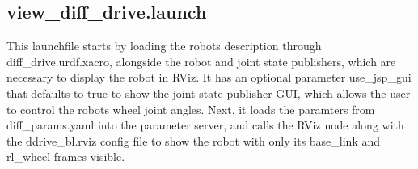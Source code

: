 \subsection*{view\+\_\+diff\+\_\+drive.\+launch}

This launchfile starts by loading the robot\textquotesingle{}s description through {\ttfamily diff\+\_\+drive.\+urdf.\+xacro}, alongside the robot and joint state publishers, which are necessary to display the robot in {\ttfamily R\+Viz}. It has an optional parameter {\ttfamily use\+\_\+jsp\+\_\+gui} that defaults to true to show the joint state publisher G\+UI, which allows the user to control the robot\textquotesingle{}s wheel joint angles. Next, it loads the paramters from {\ttfamily diff\+\_\+params.\+yaml} into the parameter server, and calls the {\ttfamily R\+Viz} node along with the {\ttfamily ddrive\+\_\+bl.\+rviz} config file to show the robot with only its {\ttfamily base\+\_\+link} and {\ttfamily rl\+\_\+wheel} frames visible. 